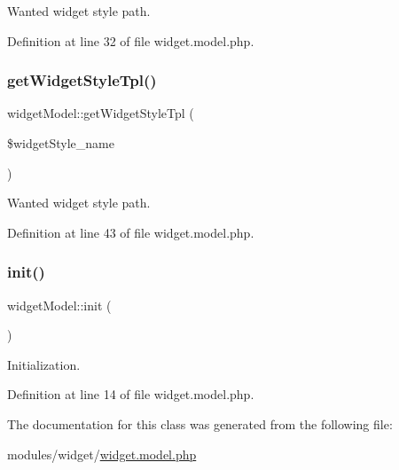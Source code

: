 Wanted widget style path. 



Definition at line 32 of file widget.\+model.\+php.

\hypertarget{classwidgetModel_a772aadab9c4dd23780bc3de738f63829}{}\label{classwidgetModel_a772aadab9c4dd23780bc3de738f63829} 
\subsubsection{\texorpdfstring{get\+Widget\+Style\+Tpl()}{getWidgetStyleTpl()}}
{\footnotesize\ttfamily widget\+Model\+::get\+Widget\+Style\+Tpl (\begin{DoxyParamCaption}\item[{}]{\$widget\+Style\+\_\+name }\end{DoxyParamCaption})}



Wanted widget style path. 



Definition at line 43 of file widget.\+model.\+php.

\hypertarget{classwidgetModel_a7bfe5611dc4916771b7ec2c148581f29}{}\label{classwidgetModel_a7bfe5611dc4916771b7ec2c148581f29} 
\subsubsection{\texorpdfstring{init()}{init()}}
{\footnotesize\ttfamily widget\+Model\+::init (\begin{DoxyParamCaption}{ }\end{DoxyParamCaption})}



Initialization. 



Definition at line 14 of file widget.\+model.\+php.



The documentation for this class was generated from the following file\+:\begin{DoxyCompactItemize}
\item 
modules/widget/\hyperlink{widget_8model_8php}{widget.\+model.\+php}\end{DoxyCompactItemize}
